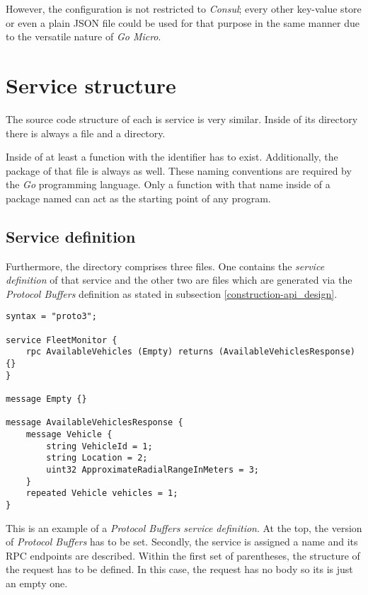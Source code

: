 \documentclass[12pt,a4paper,twoside]{report}
\begin{document}
However, the configuration is not restricted to \textit{Consul};
every other key-value store or even a plain JSON file could be used
for that purpose in the same manner due to the versatile nature of \textit{Go Micro}.


\section{Service structure}

The source code structure of each is service is very similar.
Inside of its directory there is always a  file and a 
directory.

Inside of  at least a function with the identifier
 has to exist. Additionally, the package of that file is always
 as well. These naming conventions are required by the
\textit{Go} programming language. Only a function with that name inside of
a package named  can act as the starting point of any program.

\subsection{Service definition} \label{subsect:service-definition}
Furthermore, the  directory comprises three files.
One contains the \textit{service definition} of that service and the other
two are  files which are generated via the \textit{Protocol Buffers}
definition as stated in subsection \ref{construction-api_design}.

\begin{lstlisting}[title=services/fleet-monitor/proto/fleet-monitor.proto, language=protobuf3]
syntax = "proto3";

service FleetMonitor {
    rpc AvailableVehicles (Empty) returns (AvailableVehiclesResponse) {}
}

message Empty {}

message AvailableVehiclesResponse {
    message Vehicle {
        string VehicleId = 1;
        string Location = 2;
        uint32 ApproximateRadialRangeInMeters = 3;
    }
    repeated Vehicle vehicles = 1;
}
\end{lstlisting}

This is an example of a \textit{Protocol Buffers service definition}.
At the top, the version of \textit{Protocol Buffers} has to be set.
Secondly, the service is assigned a name and its RPC endpoints are described.
Within the first set of parentheses, the structure of the request has to be
defined. In this case, the request has no body so its  is just an
empty one.
\end{document}
